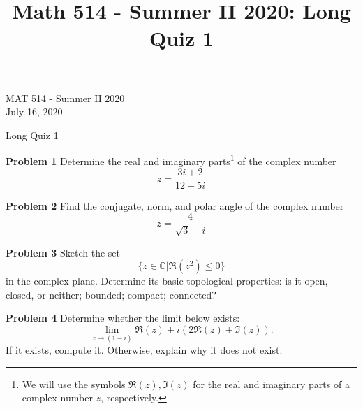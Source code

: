\documentclass[12pt,oneside]{exam}
\title{Math 514 - Summer II 2020: Long Quiz 1}
\newenvironment{exercise}[1]{\vspace{.1in}\noindent\textbf{Problem #1 \hspace{.05em}}}{}
\newcommand{\C}{\mathbb{C}}
\begin{document}
\begin{flushright}
\sc MAT 514 - Summer II 2020\\
July 16, 2020
\end{flushright}
\bigskip
 
\begin{center}
\textsf{Long Quiz 1} 
\end{center}


\begin{exercise}{1}
Determine the real and imaginary parts\footnote{We will use the symbols $\Re(z), \Im(z)$ for the real and imaginary parts of a complex number $z$, respectively.} of the complex number 
\begin{equation*}
z = \frac{3i+2}{12+5i}
\end{equation*}
\end{exercise}

\vfill
\begin{exercise}{2}
Find the conjugate, norm, and polar angle of the complex number
\begin{equation*}
z = \frac{4}{\sqrt{3}-i}
\end{equation*}
\end{exercise}
\vfill

\newpage

\begin{exercise}{3}
Sketch the set 
\begin{equation*}
\{z \in \C | \Re(z^2) \leq 0 \}
\end{equation*}
in the complex plane. Determine its basic topological properties: is it open, closed, or neither; bounded; compact; connected?
\end{exercise}
\vfill 

\begin{exercise}{4}
Determine whether the limit below exists:
\begin{equation*}
\lim_{z \to (1-i)} \Re(z)+i(2\Re(z) + \Im(z)).
\end{equation*}
If it exists, compute it. Otherwise, explain why it does not exist. 
\end{exercise}

\vfill
\end{document}

